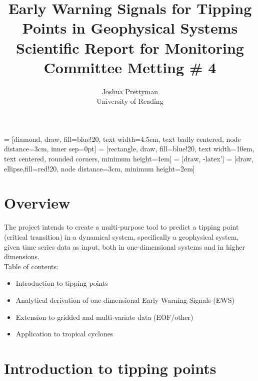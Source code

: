 \documentclass[11pt,a4paper,reqno]{article}
\numberwithin{equation}{section}
\begin{document}


\title{Early Warning Signals for Tipping Points in Geophysical Systems\\ {\small Scientific Report for Monitoring Committee Metting \# 4}}
\author{Joshua Prettyman\\ University of Reading}
\maketitle

 = [diamond, draw, fill=blue!20, 
    text width=4.5em, text badly centered, node distance=3cm, inner sep=0pt]
 = [rectangle, draw, fill=blue!20, 
    text width=10em, text centered, rounded corners, minimum height=4em]
 = [draw, -latex']
 = [draw, ellipse,fill=red!20, node distance=3cm,
    minimum height=2em]
    
\section*{Overview}

The project intends to create a multi-purpose tool to predict a tipping point (critical transition) in a dynamical system, specifically a geophysical system, given time series data as input, both in one-dimensional systems and in higher dimensions.\\

Table of contents:
\begin{itemize}
\item[\ref{sec_tippingpoints}.] Introduction to tipping points
\item[\ref{sec_EWS_methods}.] Analytical derivation of one-dimensional Early Warning Signals (EWS) 
\item[\ref{sec_gridded}.] Extension to gridded and multi-variate data (EOF/other)
\item[\ref{sec_hurricanes}.] Application to tropical cyclones
\end{itemize}

\section{Introduction to tipping points}
\label{sec_tippingpoints}
\end{document}
